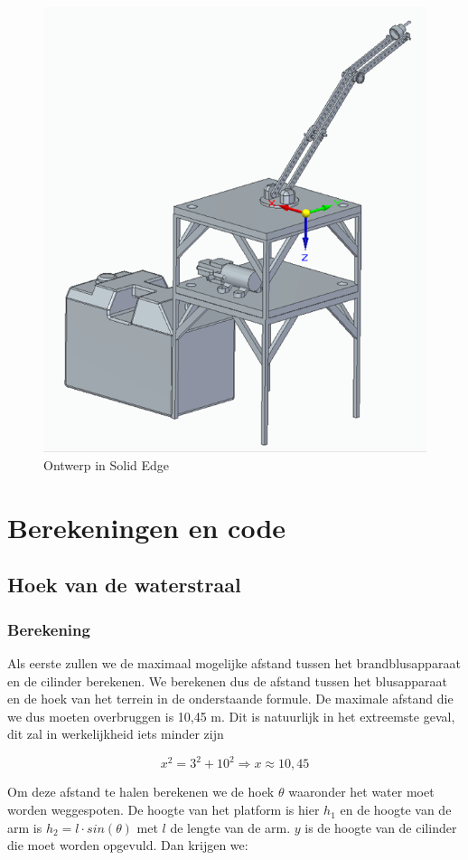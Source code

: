 \documentclass[kulak]{kulakarticle} %
\begin{document}
			\begin{figure} [!h]
				\centering
				\includegraphics[width = .6 \textwidth]{Solid Edge Assembly foto}
				\caption{Ontwerp in Solid Edge}
				\label{ontwerp}
			\end{figure}



\section{Berekeningen en code}


	\subsection{Hoek van de waterstraal}
	
	
		\subsubsection{Berekening}
		
			Als eerste zullen we de maximaal mogelijke afstand tussen het brandblusapparaat en de cilinder berekenen. We berekenen dus de afstand tussen het blusapparaat en de hoek van het terrein in de onderstaande formule. De maximale afstand die we dus moeten overbruggen is 10,45 m. Dit is natuurlijk in het extreemste geval, dit zal in werkelijkheid iets minder zijn
		
				\begin{equation}
					x^2 = 3^2 + 10^2
					\Rightarrow x \approx 10,45 
				\end{equation}
				
			Om deze afstand te halen berekenen we de hoek $\theta$ waaronder het water moet worden weggespoten. De hoogte van het platform is hier \(h_1\) en de hoogte van de arm is \(h_2 = l \cdot sin(\theta)\) met \(l\) de lengte van de arm. \(y\) is de hoogte van de cilinder die moet worden opgevuld. Dan krijgen we:
			
\end{document}
